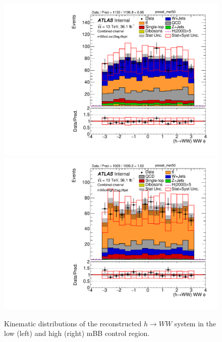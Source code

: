 \begin{figure}[!h]
\begin{center}
\includegraphics[scale=0.33]{./figures/boosted/PlotByMbbRegions/DataMC_2tag_0bjet_mbbcrLow_lepton_presel_met50_WWPhi}                                                                               
\includegraphics[scale=0.33]{./figures/boosted/PlotByMbbRegions/DataMC_2tag_0bjet_mbbcrHigh_lepton_presel_met50_WWPhi}                                                                              
\caption{Kinematic distributions of the reconstructed $h \to WW$ system in the low (left) and high (right) mBB control region.}
\label{fig:boosted_mbbcrHighLow_wwsystem}
\end{center}
\end{figure}

